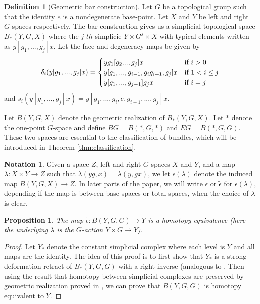 \documentclass[psamsfonts]{amsart}
\newtheorem{prop}[thm]{Proposition}
\theoremstyle{definition}
\newtheorem{defn}[thm]{Definition}
\newtheorem{notn}[thm]{Notation}
\theoremstyle{remark}
\numberwithin{equation}{section}
\begin{document}
\begin{defn}[Geometric bar construction]
Let $G$ be a topological group such that the identity $e$ is a nondegenerate base-point. Let $X$ and $Y$ be left and right $G$-spaces respectively. The bar construction gives us a simplicial topological space $B_{*}(Y, G, X)$ where the $j$-$th$ simplicie $Y \times G^{j} \times X$ with typical elements written as $y[g_{1}, ..., g_{j}]x$. Let the face and degeneracy maps be given by
\begin{displaymath}
\delta_{i}(y[g_{1}, ..., g_{j}]x) = \begin{cases}
yg_{1}[g_{2} ..., g_{j}]x & \text{if $ i > 0$}\\
y[g_{1}, ..., g_{i - 1}, g_{i}g_{i + 1}, g_{j}]x & \text{if $ 1 < i \leq j$}\\
y[g_{1}, ..., g_{j - 1}]g_{j}x & \text{if $ i = j$}\\
\end{cases}
\end{displaymath}
and $s_{i}(y[g_{1}, ..., g_{j}]x) = y[g_{1}, ..., g_{i}, e, g_{i + 1}, ..., g_{j}]x$.
\end{defn}

Let $B(Y, G, X)$ denote the geometric realization of $B_{*}(Y, G, X)$. Let $*$ denote the one-point $G$-space and define $BG = B(*, G, *)$ and $EG = B(*, G, G)$. These two spaces are essential to the classification of bundles, which will be introduced in Theorem \ref{thm:classification}.

\begin{notn}
\label{notn:epsilon}
Given a space $Z$, left and right $G$-spaces $X$ and $Y$, and a map $\lambda: X \times Y \to Z$ such that $\lambda(yg, x) = \lambda(y, gx)$, we let $\epsilon(\lambda)$ denote the induced map $B(Y, G, X) \to Z$. In later parts of the paper, we will write $\epsilon$ or $\tilde{\epsilon}$ for $\epsilon(\lambda)$, depending if the map is between base spaces or total spaces, when the choice of $\lambda$ is clear.	
\end{notn}


\begin{prop}
\label{prop:extraDeneracy}
The map $\tilde{\epsilon}: B(Y, G, G) \rightarrow Y$ is a homotopy equivalence (here the underlying $\lambda$ is the $G$-action $Y \times G \to Y$).
\end{prop}
\begin{proof}

Let $Y_{*}$ denote the constant simplicial complex where each level is $Y$ and all maps are the identity. The idea of this proof is to first show that $Y_{*}$ is a strong deformation retract of $B_{*}(Y, G, G)$ with a right inverse (analogous to \cite[Proposition 9.8]{Iterated}. Then using the result that homotopy between simplicial complexes are preserved by geometric realization proved in \cite[Corollary 11.1]{Iterated}, we can prove that $B(Y, G, G)$ is homotopy equivalent to $Y$. 
\end{proof}
\end{document}

